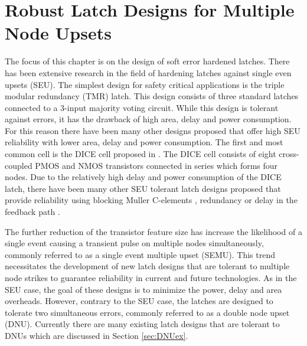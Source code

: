 \chapter{Robust Latch Designs for Multiple Node Upsets} \label{ch1}

The focus of this chapter is on the design of soft error hardened latches. There has been extensive research in the field of hardening latches against single even upsets (SEU). The simplest design for safety critical applications is the triple modular redundancy (TMR) latch. This design consists of three standard latches connected to a 3-input majority voting circuit. While this design is tolerant against errors, it has the drawback of high area, delay and power consumption. For this reason there have been many other designs proposed that offer high SEU reliability with lower area, delay and power consumption. The first and most common cell is the DICE cell proposed in \cite{DICE}. The DICE cell consists of eight cross-coupled PMOS and NMOS transistors connected in series which forms four nodes. Due to the relatively high delay and power consumption of the DICE latch, there have been many other SEU tolerant latch designs proposed that provide reliability using blocking Muller C-elements \cite{Muller1956}, redundancy or delay in the feedback path \cite{HIPER, FERST, Hazucha, SEMULatch, Multivdd, BISER, NicoFeedback}.

The further reduction of the transistor feature size has increase the likelihood of a single event causing a transient pulse on multiple nodes simultaneously, commonly referred to as a single event multiple upset (SEMU). This trend necessitates the development of new latch designs that are tolerant to multiple node strikes to guarantee reliability in current and future technologies. As in the SEU case, the goal of these designs is to minimize the power, delay and area overheads. However, contrary to the SEU case, the latches are designed to tolerate two simultaneous errors, commonly referred to as a double node upset (DNU). Currently there are many existing latch designs that are tolerant to DNUs which are discussed in Section \ref{sec:DNUex}.   

